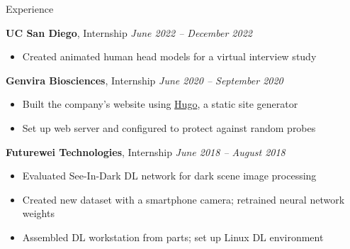 	\begin{rSection}{Experience}

		{\bf UC San Diego}{, Internship} \hfill {\em June 2022 -- December 2022}
		\begin{itemize}
			\item Created animated human head models for a virtual interview study
		\end{itemize}

		{\bf Genvira Biosciences}{, Internship} \hfill {\em June 2020 -- September 2020}
		\begin{itemize}
			\item Built the company's website using \href{https://gohugo.io/}{Hugo}, a static site generator
			\item Set up web server and configured to protect against random probes
		\end{itemize}

		{\bf Futurewei Technologies}{, Internship} \hfill {\em June 2018 -- August 2018}
		\begin{itemize}
			\item Evaluated See-In-Dark DL network for dark scene image processing
			\item Created new dataset with a smartphone camera; retrained neural network weights
			\item Assembled DL workstation from parts; set up Linux DL environment
		\end{itemize}
	\end{rSection}
	
